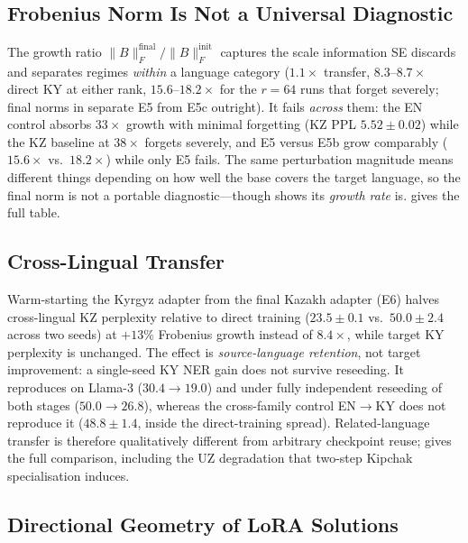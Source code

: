 \documentclass[11pt]{article}
\begin{document}
\subsection{Frobenius Norm Is Not a Universal Diagnostic}
\label{sec:frobenius}

The growth ratio $\|B\|_F^{\text{final}}/\|B\|_F^{\text{init}}$ captures the scale information SE discards and separates regimes \emph{within} a language category ($1.1\times$ transfer, $8.3$--$8.7\times$ direct KY at either rank, $15.6$--$18.2\times$ for the $r{=}64$ runs that forget severely; final norms in  separate E5 from E5c outright). It fails \emph{across} them: the EN control absorbs $33\times$ growth with minimal forgetting (KZ PPL $5.52\pm0.02$) while the KZ baseline at $38\times$ forgets severely, and E5 versus E5b grow comparably ($15.6\times$ vs.\ $18.2\times$) while only E5 fails. The same perturbation magnitude means different things depending on how well the base covers the target language, so the final norm is not a portable diagnostic---though  shows its \emph{growth rate} is.  gives the full table.

\subsection{Cross-Lingual Transfer}
\label{sec:transfer}

Warm-starting the Kyrgyz adapter from the final Kazakh adapter (E6) halves cross-lingual KZ perplexity relative to direct training ($23.5\pm0.1$ vs.\ $50.0\pm2.4$ across two seeds) at $+13\%$ Frobenius growth instead of $8.4\times$, while target KY perplexity is unchanged. The effect is \emph{source-language retention}, not target improvement: a single-seed KY NER gain does not survive reseeding. It reproduces on Llama-3 ($30.4 \to 19.0$) and under fully independent reseeding of both stages ($50.0 \to 26.8$), whereas the cross-family control EN$\rightarrow$KY does not reproduce it ($48.8\pm1.4$, inside the direct-training spread). Related-language transfer is therefore qualitatively different from arbitrary checkpoint reuse;  gives the full comparison, including the UZ degradation that two-step Kipchak specialisation induces.

\subsection{Directional Geometry of LoRA Solutions}
\label{sec:directional}
\end{document}
